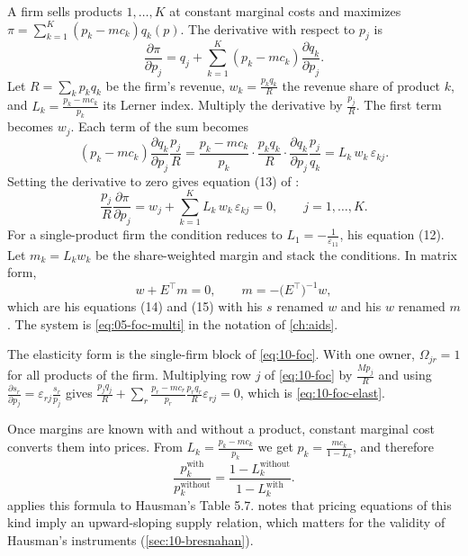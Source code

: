 A firm sells products $1,\dots,K$ at constant marginal costs and maximizes
$\pi = \sum_{k=1}^K(p_k - mc_k)q_k(p)$. The derivative with respect to $p_j$ is
\begin{equation*}
  \frac{\partial\pi}{\partial p_j} = q_j + \sum_{k=1}^K(p_k - mc_k)\frac{\partial q_k}{\partial p_j}.
\end{equation*}
Let $R = \sum_kp_kq_k$ be the firm's revenue, $w_k = \frac{p_kq_k}{R}$ the revenue share of product $k$, and
$L_k = \frac{p_k - mc_k}{p_k}$ its Lerner index. Multiply the derivative by $\frac{p_j}{R}$. The first term
becomes $w_j$. Each term of the sum becomes
\begin{equation*}
  (p_k - mc_k)\frac{\partial q_k}{\partial p_j}\frac{p_j}{R}
  = \frac{p_k - mc_k}{p_k}\cdot\frac{p_kq_k}{R}\cdot\frac{\partial q_k}{\partial p_j}\frac{p_j}{q_k}
  = L_k\,w_k\,\varepsilon_{kj}.
\end{equation*}
Setting the derivative to zero gives equation (13) of \citet{Hausman1997}:
\begin{equation}\label{eq:10-foc-elast}
  \frac{p_j}{R}\frac{\partial\pi}{\partial p_j} = w_j + \sum_{k=1}^KL_k\,w_k\,\varepsilon_{kj} = 0, \qquad j = 1,\dots,K.
\end{equation}
For a single-product firm the condition reduces to $L_1 = -\frac{1}{\varepsilon_{11}}$, his equation (12).
Let $m_k = L_kw_k$ be the share-weighted margin and stack the conditions. In matrix form,
\begin{equation}\label{eq:10-foc-matrix}
  w + E^\top m = 0, \qquad m = -\bigl(E^\top\bigr)^{-1}w,
\end{equation}
which are his equations (14) and (15) with his $s$ renamed $w$ and his $w$ renamed $m$. The system is
\eqref{eq:05-foc-multi} in the notation of \cref{ch:aids}.

The elasticity form is the single-firm block of \eqref{eq:10-foc}. With one owner, $\Omega_{jr} = 1$ for all
products of the firm. Multiplying row $j$ of \eqref{eq:10-foc} by $\frac{Mp_j}{R}$ and using
$\frac{\partial s_r}{\partial p_j} = \varepsilon_{rj}\frac{s_r}{p_j}$ gives
$\frac{p_jq_j}{R} + \sum_r\frac{p_r - mc_r}{p_r}\frac{p_rq_r}{R}\varepsilon_{rj} = 0$, which is
\eqref{eq:10-foc-elast}.

Once margins are known with and without a product, constant marginal cost converts them into prices. From
$L_k = \frac{p_k - mc_k}{p_k}$ we get $p_k = \frac{mc_k}{1 - L_k}$, and therefore
\begin{equation}\label{eq:10-price-ratio}
  \frac{p_k^{\text{with}}}{p_k^{\text{without}}} = \frac{1 - L_k^{\text{without}}}{1 - L_k^{\text{with}}}.
\end{equation}
 applies this formula to Hausman's Table 5.7. \citet[p.~241, n.~7]{Bresnahan1997} notes
that pricing equations of this kind imply an upward-sloping supply relation, which matters for the validity of
Hausman's instruments (\cref{sec:10-bresnahan}).

